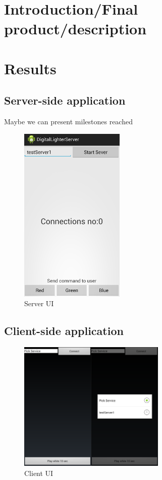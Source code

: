 \section{Introduction/Final product/description}
\section{Results}
\subsection{Server-side application}

Maybe we can present milestones reached

\begin{figure}[H]
	\centering
		\includegraphics[width=5cm]{conclusion/server_ui.png}
	\caption{Server UI}
	\label{fig:Server_UI }
\end{figure}

\subsection{Client-side application}
\begin{figure}[H]
	\centering
		\includegraphics[width=7cm]{conclusion/user_ui.png}
	\caption{Client UI}
	\label{fig:Client_UI }
\end{figure}
